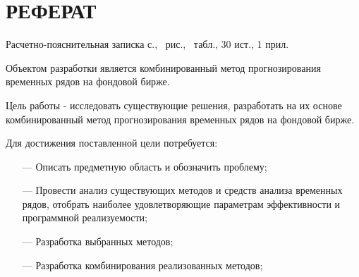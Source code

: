 \section*{РЕФЕРАТ}

Расчетно-пояснительная записка \pageref{LastPage} с., \totalfigures\ рис., \totaltables\ табл., 30 ист., 1 прил.

\par Объектом разработки является комбинированный метод прогнозирования временных рядов на фондовой бирже.
\par Цель работы - исследовать существующие решения, разработать на их основе комбинированный метод прогнозирования временных рядов на фондовой бирже.
\par Для достижения поставленной цели потребуется:
\begin{itemize}[leftmargin=1.6\parindent]
    \item[---] Описать предметную область и обозначить проблему;
	\item[---] Провести анализ существующих методов и средств анализа временных рядов, отобрать наиболее удовлетворяющие параметрам эффективности и программной реализуемости;
	\item[---] Разработка выбранных методов;
	\item[---] Разработка комбинирования реализованных методов;
\end{itemize}

\pagebreak